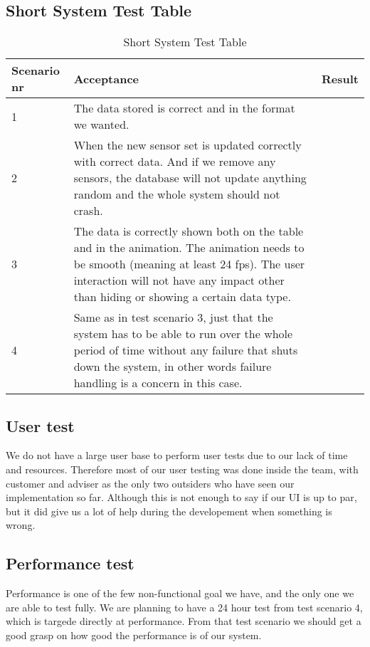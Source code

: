\documentclass[../document]{subfiles}
\begin{document}
\subsection{Short System Test Table}
\begin{table}[H]
\caption{Short System Test Table}
\centering
\begin{tabularx}{\textwidth}{|l|X|X|}
	\hline
	Scenario nr
	&Acceptance
	&Result
	\\ \hline 1
	&The data stored is correct and in the format we wanted.
	&
	\\ \hline 2
	&When the new sensor set is updated correctly with correct data. And if we remove any sensors, the database will not update anything random and the whole system should not crash.
	&
	\\ \hline 3
	&The data is correctly shown both on the table and in the animation. The animation needs to be smooth (meaning at least 24 fps). The user interaction will not have any impact other than hiding or showing a certain data type.
	&
	\\ \hline 4
	&Same as in test scenario 3, just that the system has to be able to run over the whole period of time without any failure that shuts down the system, in other words failure handling is a concern in this case.
	&
	\\ \hline 
\end{tabularx}
\end{table}

\subsection{User test}
We do not have a large user base to perform user tests due to our lack of time and resources. Therefore most of our user testing was done inside the team, with customer and adviser as the only two outsiders who have seen our implementation so far. Although this is not enough to say if our UI is up to par, but it did give us a lot of help during the developement when something is wrong.

\subsection{Performance test}
Performance is one of the few non-functional goal we have, and the only one we are able to test fully. We are planning to have a 24 hour test from test scenario 4, which is targede directly at performance. From that test scenario we should get a good grasp on how good the performance is of our system.
\end{document}
